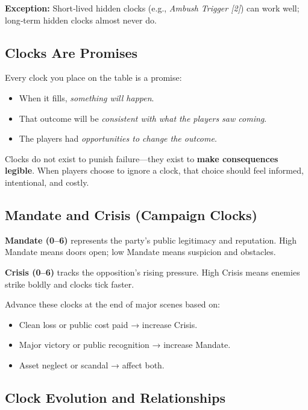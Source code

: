 \textbf{Exception:} Short‑lived hidden clocks (e.g., \emph{Ambush Trigger [2]}) can work well; long‑term hidden clocks almost never do.

\subsection{Clocks Are Promises}
\label{subsec:clocks-promises}

Every clock you place on the table is a promise:
\begin{itemize}
  \item When it fills, \emph{something will happen}.
  \item That outcome will be \emph{consistent with what the players saw coming}.
  \item The players had \emph{opportunities to change the outcome}.
\end{itemize}
Clocks do not exist to punish failure—they exist to \textbf{make consequences legible}. When players choose to ignore a clock, that choice should feel informed, intentional, and costly.

\subsection{Mandate and Crisis (Campaign Clocks)}
\label{subsec:mandate-crisis}

\textbf{Mandate (0–6)} represents the party’s public legitimacy and reputation. High Mandate means doors open; low Mandate means suspicion and obstacles.

\textbf{Crisis (0–6)} tracks the opposition’s rising pressure. High Crisis means enemies strike boldly and clocks tick faster.

Advance these clocks at the end of major scenes based on:
\begin{itemize}
  \item Clean loss or public cost paid → increase Crisis.
  \item Major victory or public recognition → increase Mandate.
  \item Asset neglect or scandal → affect both.
\end{itemize}

\subsection{Clock Evolution and Relationships}
\label{subsec:clock-evolution}

